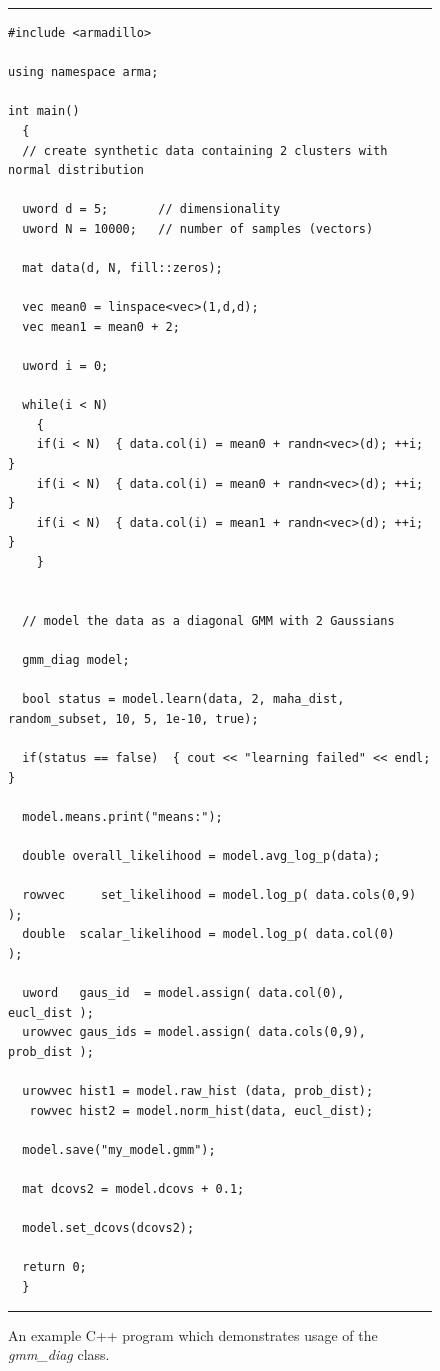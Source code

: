 \begin{figure}[!tb]
\hrule
\vspace{1ex}
\centering
\begin{Verbatim}[fontsize=\footnotesize]
#include <armadillo>

using namespace arma;

int main()
  {
  // create synthetic data containing 2 clusters with normal distribution
  
  uword d = 5;       // dimensionality
  uword N = 10000;   // number of samples (vectors)
  
  mat data(d, N, fill::zeros);
  
  vec mean0 = linspace<vec>(1,d,d);
  vec mean1 = mean0 + 2;
  
  uword i = 0;
  
  while(i < N)
    {
    if(i < N)  { data.col(i) = mean0 + randn<vec>(d); ++i; }
    if(i < N)  { data.col(i) = mean0 + randn<vec>(d); ++i; }
    if(i < N)  { data.col(i) = mean1 + randn<vec>(d); ++i; }
    }
  
  
  // model the data as a diagonal GMM with 2 Gaussians
  
  gmm_diag model;
  
  bool status = model.learn(data, 2, maha_dist, random_subset, 10, 5, 1e-10, true);
  
  if(status == false)  { cout << "learning failed" << endl; }
  
  model.means.print("means:");
  
  double overall_likelihood = model.avg_log_p(data);
  
  rowvec     set_likelihood = model.log_p( data.cols(0,9) );
  double  scalar_likelihood = model.log_p( data.col(0)    );
  
  uword   gaus_id  = model.assign( data.col(0),    eucl_dist );
  urowvec gaus_ids = model.assign( data.cols(0,9), prob_dist );
  
  urowvec hist1 = model.raw_hist (data, prob_dist);
   rowvec hist2 = model.norm_hist(data, eucl_dist);
  
  model.save("my_model.gmm");
  
  mat dcovs2 = model.dcovs + 0.1;
  
  model.set_dcovs(dcovs2);
  
  return 0;
  }

\end{Verbatim}
\vspace{-1ex}
\hrule
\vspace{0.5ex}
\caption
  {
  An example C++ program which demonstrates usage of the {\it gmm\_diag} class.
  }
\label{fig:example_usage}
\end{figure}

